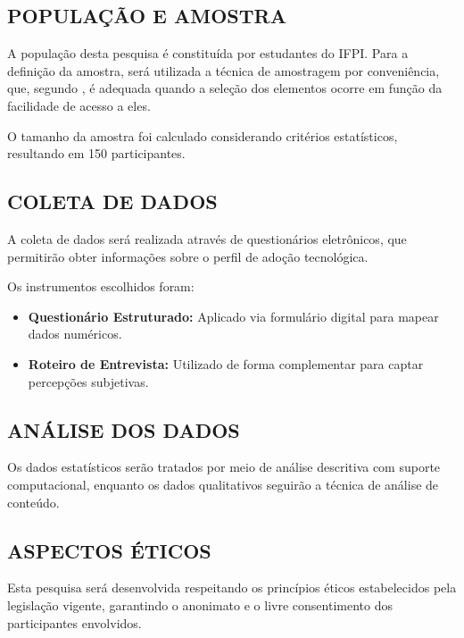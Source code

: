 \subsection{POPULAÇÃO E AMOSTRA}
\label{subsec:populacao-amostra}

A população desta pesquisa é constituída por estudantes do IFPI. Para a definição da amostra, será utilizada a técnica de amostragem por conveniência, que, segundo , é adequada quando a seleção dos elementos ocorre em função da facilidade de acesso a eles.

O tamanho da amostra foi calculado considerando critérios estatísticos, resultando em 150 participantes.

\subsection{COLETA DE DADOS}
\label{subsec:coleta-dados}

A coleta de dados será realizada através de questionários eletrônicos, que permitirão obter informações sobre o perfil de adoção tecnológica.

Os instrumentos escolhidos foram:
\begin{itemize}
    \item \textbf{Questionário Estruturado:} Aplicado via formulário digital para mapear dados numéricos.
    \item \textbf{Roteiro de Entrevista:} Utilizado de forma complementar para captar percepções subjetivas.
\end{itemize}

\subsection{ANÁLISE DOS DADOS}
\label{subsec:análise}

Os dados estatísticos serão tratados por meio de análise descritiva com suporte computacional, enquanto os dados qualitativos seguirão a técnica de análise de conteúdo.

\subsection{ASPECTOS ÉTICOS}
\label{subsec:aspectos-eticos}

Esta pesquisa será desenvolvida respeitando os princípios éticos estabelecidos pela legislação vigente, garantindo o anonimato e o livre consentimento dos participantes envolvidos.

